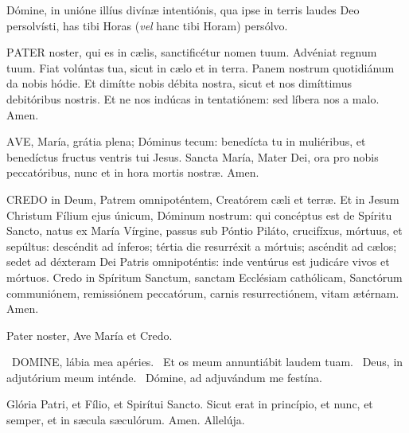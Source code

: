 Dómine, in unióne illíus divínæ intentiónis, qua ipse in terris laudes Deo persolvísti, has tibi Horas (\textit{vel} hanc tibi Horam) persólvo.



\lettrine[lines=2]{P}{ATER} noster, qui es in cælis, sanctificétur nomen tuum. Advéniat regnum tuum. Fiat volúntas tua, sicut in cælo et in terra. Panem nostrum quotidiánum da nobis hódie. Et dimítte nobis débita nostra, sicut et nos dimíttimus debitóribus nostris. Et ne nos indúcas in tentatiónem: sed líbera nos a malo. Amen.

\lettrine[lines=2]{A}{VE}, María, grátia plena; Dóminus tecum: benedícta tu in muliéribus, et benedíctus fructus ventris tui Jesus. Sancta María, Mater Dei, ora pro nobis peccatóribus, nunc et in hora mortis nostræ. Amen.


\lettrine[lines=2]{C}{REDO} in Deum, Patrem omnipoténtem, Creatórem cæli et terræ. Et in Jesum Christum Fílium ejus únicum, Dóminum nostrum: qui concéptus est de Spíritu Sancto, natus ex María Vírgine, passus sub Póntio Piláto, crucifíxus, mórtuus, et sepúltus: descéndit ad ínferos; tértia die resurréxit a mórtuis; ascéndit ad cælos; sedet ad déxteram Dei Patris omnipoténtis: inde ventúrus est judicáre vivos et mórtuos. Credo in Spíritum Sanctum, sanctam Ecclésiam cathólicam, Sanctórum communiónem, remissiónem peccatórum, carnis resurrectiónem, vitam ætérnam. Amen.



Pater noster, Ave María et Credo.


\V\ \lettrine[lines=2]{D}{OMINE}, lábia mea apéries. \R\ Et os meum annuntiábit laudem tuam. \V\ Deus, in adjutórium meum inténde. \R\ Dómine, ad adjuvándum me festína.

Glória Patri, et Fílio, et Spirítui Sancto. Sicut erat in princípio, et nunc, et semper, et in sæcula sæculórum. Amen. Allelúja.

